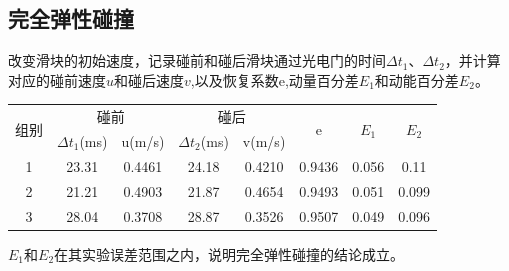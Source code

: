 \documentclass{article}
\begin{document}
\subsection{完全弹性碰撞}
\hspace*{2em}改变滑块的初始速度，记录碰前和碰后滑块通过光电门的时间$\Delta t_1、\Delta t_2$，并计算对应的碰前速度$u$和碰后速度$v$,以及恢复系数e,动量百分差$E_1$和动能百分差$E_2$。\\
\begin{table}[ht]
    \centering
    \begin{tabular}{ccc|ccccc}
    \hline\hline
    \multirow{2}{*}{组别} & \multicolumn{2}{c}{碰前} & \multicolumn{2}{c}{碰后} & \multirow{2}{*}{e} & \multirow{2}{*}{$E_1$} & \multirow{2}{*}{$E_2$} \\
                        & $\Delta t_1$(ms)      & u(m/s)            & $\Delta t_2$(ms)      & v(m/s)            &                    &                     &                     \\
    1                   & 23.31   & 0.4461  & 24.18   & 0.4210   & 0.9436        & 0.056         & 0.11         \\
    2                   & 21.21   & 0.4903  & 21.87   & 0.4654  & 0.9493        & 0.051         & 0.099          \\
    3                   & 28.04   & 0.3708  & 28.87   & 0.3526  & 0.9507        & 0.049         & 0.096        \\
    \hline\hline
    \end{tabular}
\end{table}
\hspace*{2em}$E_1$和$E_2$在其实验误差范围之内，说明完全弹性碰撞的结论成立。
\end{document}
